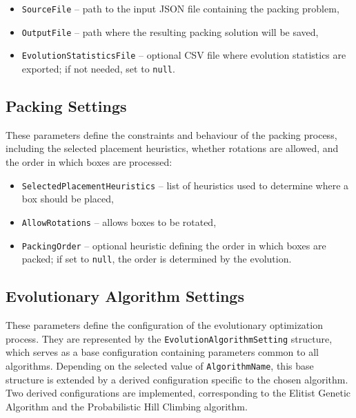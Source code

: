 \begin{itemize}
    \item \texttt{SourceFile} -- path to the input JSON file containing the packing problem,
    
    \item \texttt{OutputFile} -- path where the resulting packing solution will be saved,
    
    \item \texttt{EvolutionStatisticsFile} -- optional CSV file where evolution statistics are exported; if not needed, set to \texttt{null}.
\end{itemize}

\subsection{Packing Settings}

These parameters define the constraints and behaviour of the packing process, including the selected placement heuristics, whether rotations are allowed, and the order in which boxes are processed:

\begin{itemize}
    \item \texttt{SelectedPlacementHeuristics} -- list of heuristics used to determine where a box should be placed,
    
    \item \texttt{AllowRotations} -- allows boxes to be rotated,
    
    \item \texttt{PackingOrder} -- optional heuristic defining the order in which boxes are packed; if set to \texttt{null}, the order is determined by the evolution.
\end{itemize}

\subsection{Evolutionary Algorithm Settings}

These parameters define the configuration of the evolutionary optimization process. 
They are represented by the \texttt{EvolutionAlgorithmSetting} structure, 
which serves as a base configuration containing parameters common to all algorithms. 
Depending on the selected value of \texttt{AlgorithmName}, this base structure is extended 
by a derived configuration specific to the chosen algorithm. 
Two derived configurations are implemented, corresponding to the Elitist Genetic Algorithm and the Probabilistic Hill Climbing algorithm.

